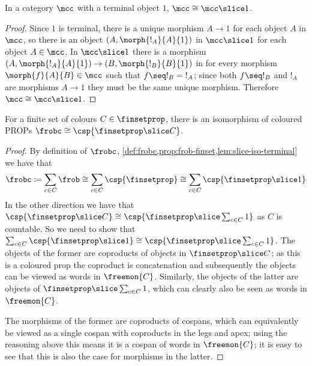 \begin{lemma}
    \label{lem:slice-iso-terminal}
    In a category \(\mcc\) with a terminal object \(1\),
    \(\mcc \cong \mcc \slice 1\).
\end{lemma}
\begin{proof}
    Since \(1\) is terminal, there is a unique morphism \(A \to 1\) for each
    object \(A\) in \(\mcc\), so there is an object \((A, \morph{!_A}{A}{1})\)
    in \(\mcc \slice 1\) for each object \(A \in \mcc\).
    In \(\mcc \slice 1\) there is a morphism
    \((A, \morph{!_A}{A}{1}) \to (B, \morph{!_B}{B}{1})\) in
    for every morphism \(\morph{f}{A}{B} \in \mcc\) such
    that \(f \seq !_B = {!_A}\); since both \(f \seq !_B\) and \(!_A\) are
    morphisms \(A \to 1\) they must be the same unique morphism.
    Therefore \(\mcc \cong \mcc \slice 1\).
\end{proof}

\begin{theorem}
    \label{thm:frobc-iso-finset-slice-c}
    For a finite set of colours \(C \in \finsetprop\), there is an isomorphism
    of coloured PROPs \(\frobc \cong \csp{\finsetprop \slice C}\).
\end{theorem}
\begin{proof}
    By definition of \(\frobc\),
    \cref{def:frobc,prop:frob-finset,lem:slice-iso-terminal}
    we have that \[
        \frobc
        \coloneqq
        \sum_{c \in C}\frob
        \cong
        \sum_{c \in C}\csp{\finsetprop}
        \cong
        \sum_{c \in C}\csp{\finsetprop \slice 1}
    \]
    In the other direction we have that \(
    \csp{\finsetprop \slice C}
    \cong
    \csp{\finsetprop \slice \sum_{c \in C} 1}
    \) as \(C\) is countable.
    So we need to show that \(
    \sum_{c \in C}\csp{\finsetprop \slice 1}
    \cong
    \csp{\finsetprop \slice \sum_{c \in C} 1}
    \).
    The objects of the former are coproducts of objects in
    \(\finsetprop \slice C\); as this is a coloured prop the coproduct is
    concatenation and subsequently the objects can be viewed as words in
    \(\freemon{C}\).
    Similarly, the objects of the latter are objects of
    \(\finsetprop \slice \sum_{c \in C} 1\), which can clearly also be
    seen as words in \(\freemon{C}\).

    The morphisms of the former are coproducts of cospans, which can
    equivalently be viewed as a single cospan with coproducts in the legs and
    apex; using the reasoning above this means it is a cospan of words in
    \(\freemon{C}\); it is easy to see that this is also the case for morphisms
    in the latter.
\end{proof}

